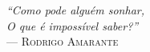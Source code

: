 {\sffamily\itshape
``Como pode alguém sonhar,\\
O que é impossível saber?''\\}
--- \textsc{Rodrigo Amarante}
